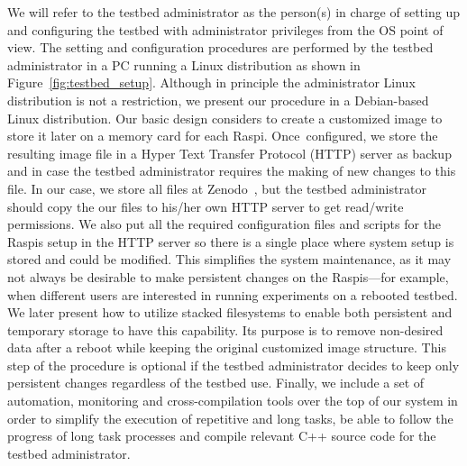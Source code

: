 \documentclass[electronics,article,accept,moreauthors,pdftex,10pt,a4paper]{mdpi}
\theoremstyle{mdpi}
\newcounter{ex}
\newcounter{re}
\theoremstyle{mdpidefinition}
\begin{document}

We will refer to the
testbed administrator as the person(s) in charge of setting up and
configuring the testbed with administrator privileges from the OS
point of view. The setting and configuration procedures are
performed by the testbed administrator in a PC running a
Linux distribution as shown in Figure~\ref{fig:testbed_setup}. Although in principle the administrator
Linux distribution is not a restriction, we present our procedure in a
Debian-based Linux distribution. Our basic design considers to create
a customized image to store it later on a memory card for each Raspi.
Once~configured, we store the resulting image file in a Hyper Text Transfer Protocol (HTTP) server
as backup and in case the testbed administrator requires the making of new
changes to this file.
In our case, we store all files at Zenodo~\cite{soerensen_chres_wiant_2016_154143}, but the testbed administrator should copy the our files to his/her own HTTP server to get read/write permissions.
We also put all the required
configuration files and scripts for the Raspis setup in the HTTP
server so there is a single place where system setup is stored and could be
modified. This simplifies the system maintenance, as it may not always be desirable to make persistent changes
on the Raspis---for example, when different users are interested in
running experiments on a rebooted testbed. We later present how
to utilize stacked filesystems to enable both persistent and
temporary storage to have this capability. Its purpose is to
remove non-desired data after a reboot while keeping the original
customized image structure. This step of the procedure is optional if
the testbed administrator decides to keep only persistent changes regardless
of the testbed use. Finally, we include a set of automation, monitoring
and cross-compilation tools over the top of our system in order to simplify
the execution of repetitive and long tasks, be able to follow the progress
of long task processes and compile relevant C++ source code for the testbed
administrator.


\end{document}
